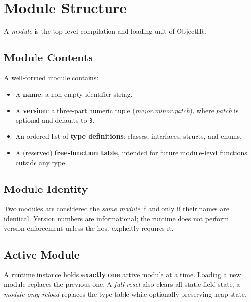 \documentclass[11pt,a4paper]{article}
\begin{document}
\section{Module Structure}
\label{sec:module}

A \emph{module} is the top-level compilation and loading unit of ObjectIR.

\subsection{Module Contents}

A well-formed module contains:

\begin{itemize}[leftmargin=1.8em]
  \item A \textbf{name}: a non-empty identifier string.
  \item A \textbf{version}: a three-part numeric tuple
    (\textit{major}.\textit{minor}.\textit{patch}), where \textit{patch} is
    optional and defaults to \texttt{0}.
  \item An ordered list of \textbf{type definitions}: classes, interfaces,
    structs, and enums.
  \item A (reserved) \textbf{free-function table}, intended for future
    module-level functions outside any type. 
\end{itemize}

\subsection{Module Identity}

Two modules are considered the \emph{same module} if and only if their names
are identical. Version numbers are informational; the runtime does not perform
version enforcement unless the host explicitly requires it.

\subsection{Active Module}

A runtime instance holds \textbf{exactly one} active module at a time.
Loading a new module replaces the previous one. A \emph{full reset} also
clears all static field state; a \emph{module-only reload} replaces the type
table while optionally preserving heap state.
\end{document}
